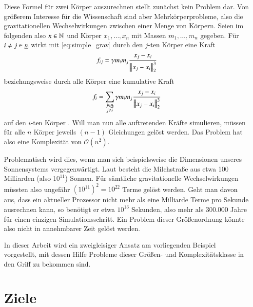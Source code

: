     Diese Formel für zwei Körper auszurechnen stellt zunächst kein Problem dar. Von größerem Interesse für die Wissenschaft sind aber Mehrkörperprobleme, also die gravitationellen 
    Wechselwirkungen zwischen einer Menge von Körpern. Seien im folgenden also $n \in \mathbb{N}$ und Körper $x_1, \dots , x_n$ mit Massen $m_1, \dots , m_n$ gegeben.
    Für $i \neq j \in \haken{n}$ wirkt mit \autoref{eq:simple_grav} durch den $j$-ten Körper eine Kraft 
    \begin{equation}
      f_{ij} = \gamma m_i m_j \frac{x_j - x_i}{\left\lVert x_j - x_i\right\rVert^3_2}
      \label{eq:multi_grav}
    \end{equation}
    beziehungsweise durch alle Körper eine kumulative Kraft
    \begin{equation}
      f_i = \sum_{\substack{j \in \haken{n} \\ j \neq i}} \gamma m_i  m_j \frac{x_j - x_i}{\norm{x_j - x_i}^3_2}
      \label{eq:sum_grav}
    \end{equation}
    auf den $i$-ten Körper \citep{wissrech}.
    Will man nun alle auftretenden Kräfte simulieren, müssen für alle $n$ Körper jeweils $(n-1)$ Gleichungen gelöst werden. Das Problem hat also eine Komplexität von
    $\mathcal{O}(n^2)$.
    
    Problematisch wird dies, wenn man sich beispielsweise die Dimensionen unseres Sonnensystems vergegenwärtigt. Laut \citet{nasa} besteht die Milchstraße aus etwa 100 Milliarden
    (also $10^{11}$) Sonnen. Für sämtliche gravitationelle Wechselwirkungen müssten also ungefähr $(10^{11})^2 = 10^{22}$ Terme gelöst werden. Geht man davon aus, dass ein aktueller 
    Prozessor nicht mehr als eine Milliarde Terme pro Sekunde ausrechnen kann, so benötigt er etwa $10^{13}$ Sekunden, also mehr als 300.000 Jahre für einen einzigen Simulationsschritt.
    Ein Problem dieser Größenordnung könnte also nicht in annehmbarer Zeit gelöst werden.\citep{wissrech} 
    
    In dieser Arbeit wird ein zweigleisiger Ansatz am vorliegenden Beispiel vorgestellt, mit dessen Hilfe Probleme dieser Größen- und Komplexitätsklasse in den Griff zu bekommen sind.
    
  \section{Ziele}
